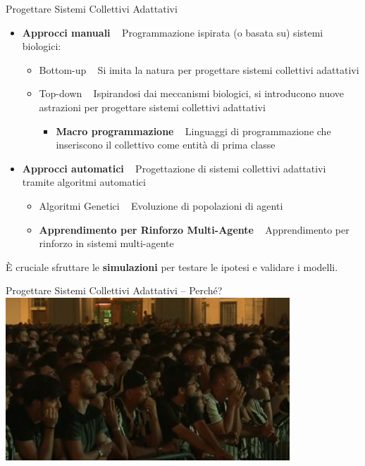 \documentclass[presentation, 10pt,aspectratio=169]{beamer}\mode<presentation>{\usetheme{AMSBolognaFC}}
\begin{document}
\begin{frame}{Progettare Sistemi Collettivi Adattativi}
	\begin{itemize}
		\item \textbf{Approcci manuali} \faArrowRight ~ Programmazione ispirata (o basata su) sistemi biologici:
		\begin{itemize}
			\item \alert{Bottom-up} \faArrowRight ~ Si imita la natura per progettare sistemi collettivi adattativi
			\item \alert{Top-down} \faArrowRight ~ Ispirandosi dai meccanismi biologici, si introducono nuove astrazioni per progettare sistemi collettivi adattativi
			\begin{itemize}
				\item \textbf{Macro programmazione} \faArrowRight ~ Linguaggi di programmazione che inseriscono il collettivo come entità di prima classe
			\end{itemize}
		\end{itemize}
		\item \textbf{Approcci automatici} \faArrowRight ~ Progettazione di sistemi collettivi adattativi tramite algoritmi automatici
		\begin{itemize}
			\item \alert{Algoritmi Genetici} \faArrowRight ~ Evoluzione di popolazioni di agenti
			\item \textbf{Apprendimento per Rinforzo Multi-Agente} \faArrowRight ~ Apprendimento per rinforzo in sistemi multi-agente
		\end{itemize}
	\end{itemize}

	È cruciale sfruttare le \alert{\textbf{simulazioni}} per testare le ipotesi e validare i modelli.
\end{frame}
\begin{frame}{Progettare Sistemi Collettivi Adattativi -- Perché?}
	\centering
	\href{https://www.youtube.com/watch?v=P0BTSKuCAOM}{
	\includegraphics[width=0.8\textwidth]{img/turin-stampede.png}
	}
\end{frame}
\end{document}
